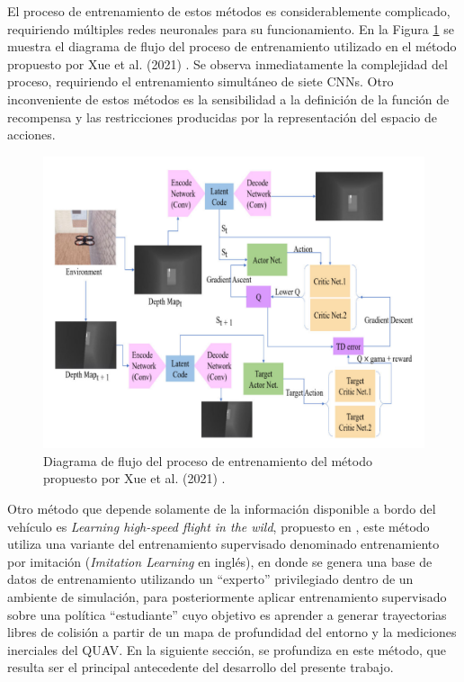El proceso de entrenamiento de estos métodos es considerablemente complicado, requiriendo múltiples redes neuronales para su funcionamiento. En la Figura \ref{fig:prev-rl-training-process} se muestra el diagrama de flujo del proceso de entrenamiento utilizado en el método propuesto por Xue et al. (2021) \cite{Xue2021}. Se observa inmediatamente la complejidad del proceso, requiriendo el entrenamiento simultáneo de siete CNNs. Otro inconveniente de estos métodos es la sensibilidad a la definición de la función de recompensa y las restricciones producidas por la representación del espacio de acciones.

\begin{figure}[H]
    \centering
    \includegraphics[scale=0.4]{partes/img/RL-training-process.png}
    \caption[Diagrama de flujo del proceso de entrenamiento utilizado en \textit{Vision Based Drone Obstacle Avoidance by Deep Reinforcement Learning}]{Diagrama de flujo del proceso de entrenamiento del método propuesto por Xue et al. (2021) \cite{Xue2021}.}
    \label{fig:prev-rl-training-process}
\end{figure}

Otro método que depende solamente de la información disponible a bordo del vehículo es \textit{Learning high-speed flight in the wild}, propuesto en \cite{Loquercio2021}, este método utiliza una variante del entrenamiento supervisado denominado entrenamiento por imitación (\textit{Imitation Learning} en inglés), en donde se genera una base de datos de entrenamiento utilizando un ``experto'' privilegiado dentro de un ambiente de simulación, para posteriormente aplicar entrenamiento supervisado sobre una política ``estudiante'' cuyo objetivo es aprender a generar trayectorias libres de colisión a partir de un mapa de profundidad del entorno y la mediciones inerciales del QUAV. En la siguiente sección, se profundiza en este método, que resulta ser el principal antecedente del desarrollo del presente trabajo.

